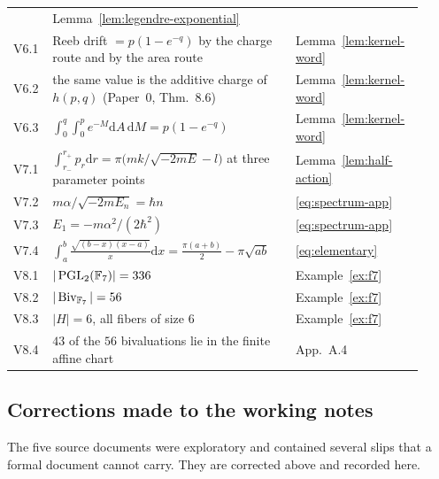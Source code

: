 \begin{center}
\begin{tabular}{@{}p{0.075\linewidth}p{0.565\linewidth}p{0.285\linewidth}@{}}
& Lemma~\ref{lem:legendre-exponential} \\
V6.1 & Reeb drift $=p(1-e^{-q})$ by the charge route and by the area route
& Lemma~\ref{lem:kernel-word} \\
V6.2 & the same value is the additive charge of $h(p,q)$ (Paper~0, Thm.~8.6)
& Lemma~\ref{lem:kernel-word} \\
V6.3 & $\int_0^q\!\!\int_0^p e^{-M}\mathrm dA\,\mathrm dM=p(1-e^{-q})$
& Lemma~\ref{lem:kernel-word} \\
V7.1 & $\int_{r_-}^{r_+}p_r\mathrm dr=\pi\bigl(mk/\sqrt{-2mE}-l\bigr)$ at three
parameter points & Lemma~\ref{lem:half-action} \\
V7.2 & $m\alpha/\sqrt{-2mE_n}=\hbar n$ & \eqref{eq:spectrum-app} \\
V7.3 & $E_1=-m\alpha^{2}/(2\hbar^{2})$ & \eqref{eq:spectrum-app} \\
V7.4 & $\int_a^b\frac{\sqrt{(b-x)(x-a)}}{x}\mathrm dx
=\frac{\pi(a+b)}{2}-\pi\sqrt{ab}$ & \eqref{eq:elementary} \\
V8.1 & $|\operatorname{PGL}_2(\mathbb{F}_7)|=336$ & Example~\ref{ex:f7} \\
V8.2 & $|\operatorname{Biv}_{\mathbb{F}_7}|=56$ & Example~\ref{ex:f7} \\
V8.3 & $|H|=6$, all fibers of size $6$ & Example~\ref{ex:f7} \\
V8.4 & $43$ of the $56$ bivaluations lie in the finite affine chart
& App.~A.4 \\
\bottomrule
\end{tabular}
\end{center}

\subsection{Corrections made to the working notes}

The five source documents were exploratory and contained several slips that a
formal document cannot carry.  They are corrected above and recorded here.

